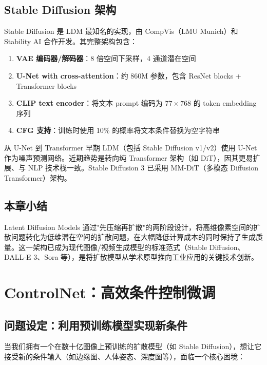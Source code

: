 \documentclass[a4paper]{article}
\begin{document}
\subsection{Stable Diffusion 架构}

Stable Diffusion 是 LDM 最知名的实现，由 CompVis（LMU Munich）和 Stability AI 合作开发。其完整架构包含：

\begin{enumerate}
    \item \textbf{VAE 编码器/解码器}：8 倍空间下采样，4 通道潜在空间
    \item \textbf{U-Net with cross-attention}：约 860M 参数，包含 ResNet blocks + Transformer blocks
    \item \textbf{CLIP text encoder}：将文本 prompt 编码为 $77\times768$ 的 token embedding 序列
    \item \textbf{CFG 支持}：训练时使用 10\% 的概率将文本条件替换为空字符串
\end{enumerate}

\begin{knowledgebox}{从 U-Net 到 Transformer}
早期 LDM（包括 Stable Diffusion v1/v2）使用 U-Net 作为噪声预测网络。近期趋势是转向纯 Transformer 架构（如 DiT），因其更易扩展、与 NLP 技术栈一致。Stable Diffusion 3 已采用 MM-DiT（多模态 Diffusion Transformer）架构。
\end{knowledgebox}

\subsection{本章小结}

Latent Diffusion Models 通过"先压缩再扩散"的两阶段设计，将高维像素空间的扩散问题转化为低维潜在空间的扩散问题，在大幅降低计算成本的同时保持了生成质量。这一架构已成为现代图像/视频生成模型的标准范式（Stable Diffusion、DALL-E 3、Sora 等），是将扩散模型从学术原型推向工业应用的关键技术创新。

\newpage
\section{ControlNet：高效条件控制微调}

\subsection{问题设定：利用预训练模型实现新条件}

当我们拥有一个在数十亿图像上预训练的扩散模型（如 Stable Diffusion），想让它接受新的条件输入（如边缘图、人体姿态、深度图等），面临一个核心困境：
\end{document}
